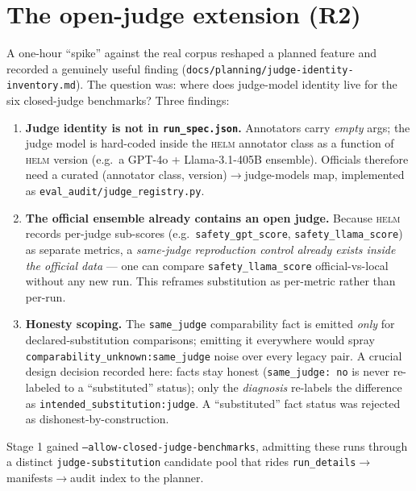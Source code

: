 \documentclass[11pt]{report}
\newcommand{\code}[1]{\texttt{#1}}
\newcommand{\file}[1]{\texttt{#1}}
\begin{document}
\section{The open-judge extension (R2)}
\label{sec:judge}

A one-hour ``spike'' against the real corpus reshaped a planned feature and
recorded a genuinely useful finding
(\file{docs/planning/judge-identity-inventory.md}). The question was: where does
judge-model identity live for the six closed-judge benchmarks? Three findings:

\begin{enumerate}[nosep]
  \item \textbf{Judge identity is not in \file{run\_spec.json}.} Annotators carry
        \emph{empty} args; the judge model is hard-coded inside the \textsc{helm}
        annotator class as a function of \textsc{helm} version (e.g.\ a GPT-4o +
        Llama-3.1-405B ensemble). Officials therefore need a curated
        (annotator class, version)$\rightarrow$judge-models map, implemented as
        \file{eval\_audit/judge\_registry.py}.
  \item \textbf{The official ensemble already contains an open judge.} Because
        \textsc{helm} records per-judge sub-scores (e.g.\ \code{safety\_gpt\_score},
        \code{safety\_llama\_score}) as separate metrics, a \emph{same-judge
        reproduction control already exists inside the official data} --- one can
        compare \code{safety\_llama\_score} official-vs-local without any new run.
        This reframes substitution as per-metric rather than per-run.
  \item \textbf{Honesty scoping.} The \code{same\_judge} comparability fact is
        emitted \emph{only} for declared-substitution comparisons; emitting it
        everywhere would spray \code{comparability\_unknown:same\_judge} noise over
        every legacy pair. A crucial design decision recorded here: facts stay
        honest (\code{same\_judge: no} is never re-labeled to a ``substituted''
        status); only the \emph{diagnosis} re-labels the difference as
        \code{intended\_substitution:judge}. A ``substituted'' fact status was
        rejected as dishonest-by-construction.
\end{enumerate}

Stage 1 gained \code{--allow-closed-judge-benchmarks}, admitting these runs through
a distinct \code{judge-substitution} candidate pool that rides
\code{run\_details}$\rightarrow$manifests$\rightarrow$audit index to the planner.
\end{document}
